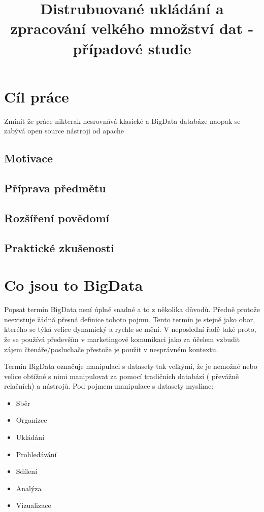 \documentclass[thesis=M,czech]{FITthesis}[2012/06/26]
\title{Distrubuované ukládání a zpracování velkého množství dat - případové studie}
\begin{document}
	

\begin{introduction}
\end{introduction}



\chapter{Cíl práce}
Zmínit že práce nikterak nesrovnává klasické a BigData databáze naopak se zabývá open source nástroji od apache

\section{Motivace}
\section{Příprava předmětu}
\section{Rozšíření povědomí}
\section{Praktické zkušenosti}


\chapter{Co jsou to BigData}

Popsat termín BigData není úplně snadné a to z několika důvodů. Předně protože neexistuje žádná přesná definice tohoto pojmu. Tento termín je stejně jako obor, kterého se týká velice dynamický a rychle se mění. V neposlední řadě také proto, že se používá především v marketingové komunikaci jako  za účelem vzbudit zájem čtenáře/posluchače přestože je použit v nesprávném kontextu.

Termín BigData označuje manipulaci s datasety tak velkými, že je nemožné nebo velice obtížné  s nimi manipulovat za pomocí tradičních databází ( převážně relačních) a nástrojů. Pod pojmem manipulace s datasety myslíme:

\begin{itemize}
  \item Sběr
  \item Organizce
  \item Ukládání
 \item Prohledávání
 \item Sdílení
 \item Analýza
 \item Vizualizace
\end{itemize}
\end{document}
